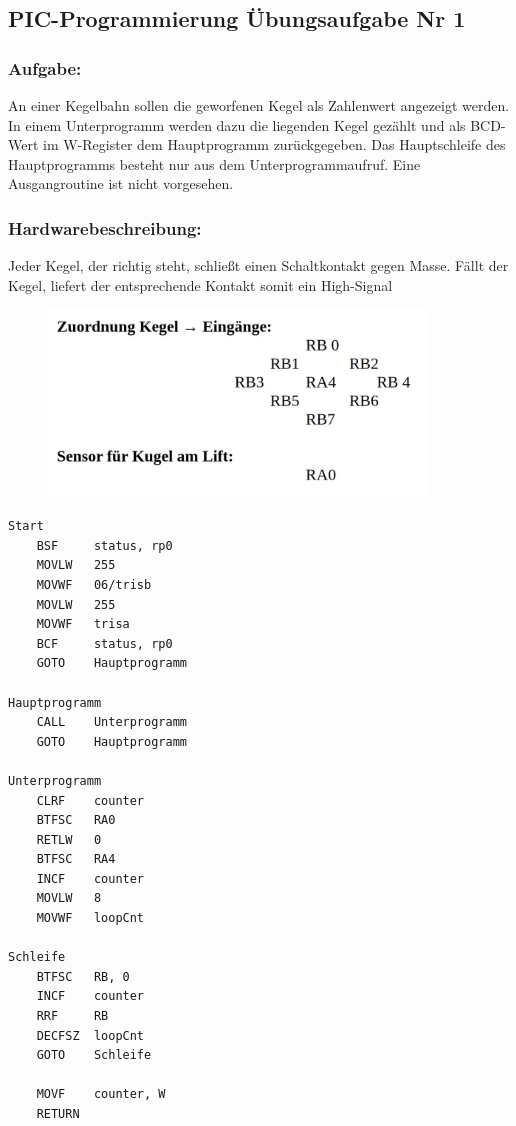 \subsection*{PIC-Programmierung Übungsaufgabe Nr 1}
\subsubsection*{Aufgabe:}
An einer Kegelbahn sollen die geworfenen Kegel als Zahlenwert angezeigt
werden. In einem Unterprogramm werden dazu die liegenden Kegel
gezählt und als BCD-Wert im W-Register dem Hauptprogramm
zurückgegeben. Das Hauptschleife des Hauptprogramms besteht nur aus
dem Unterprogrammaufruf. Eine Ausgangroutine ist nicht vorgesehen.
\subsubsection*{Hardwarebeschreibung:}
Jeder Kegel, der richtig steht, schließt einen Schaltkontakt gegen Masse.
Fällt der Kegel, liefert der entsprechende Kontakt somit ein High-Signal
\begin{figure}[H]
    \centering
    \includegraphics[width=10cm]{inputs/Kegel-Aufgabe.jpg}
    
\end{figure}
\begin{lstlisting}[language=avr]
Start
    BSF     status, rp0
    MOVLW   255
    MOVWF   06/trisb
    MOVLW   255
    MOVWF   trisa
    BCF     status, rp0
    GOTO    Hauptprogramm

Hauptprogramm
    CALL    Unterprogramm
    GOTO    Hauptprogramm

Unterprogramm
    CLRF    counter
    BTFSC   RA0
    RETLW   0
    BTFSC   RA4
    INCF    counter
    MOVLW   8
    MOVWF   loopCnt

Schleife
    BTFSC   RB, 0
    INCF    counter
    RRF     RB
    DECFSZ  loopCnt
    GOTO    Schleife

    MOVF    counter, W
    RETURN
\end{lstlisting}